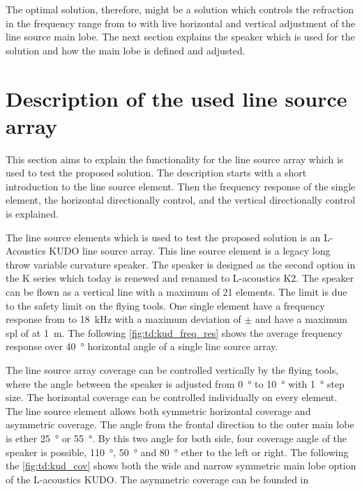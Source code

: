 
The optimal solution, therefore, might be a solution which controls the refraction in the frequency range from  to  with live horizontal and vertical adjustment of the line source main lobe. The next section explains the speaker which is used for the solution and how the main lobe is defined and adjusted.


\section{Description of the used line source array}\label{sec:prop:des_of_lin}

This section aims to explain the functionality for the line source array which is used to test the proposed solution. The description starts with a short introduction to the line source element. Then the frequency response of the single element, the horizontal directionally control, and the vertical directionally control is explained.

The line source elements which is used to test the proposed solution is an L-Acoustics KUDO line source array. This line source element is a legacy long throw variable curvature speaker. The speaker is designed as the second option in the K series which today is renewed and renamed to L-acoustics K2. The speaker can be flown as a vertical line with a maximum of 21 elements. The limit is due to the safety limit on the flying tools. One single element have a frequency response from  to \SI{18}{\kilo\hertz} with a maximum deviation of $\pm$  and have a maximum \gls{spl} of  at \SI{1}{\meter}. The following \autoref{fig:td:kud_freq_res} shows the average frequency response over \SI{40}{\degree} horizontal angle of a single line source array.



The line source array coverage can be controlled vertically by the flying tools, where the angle between the speaker is adjusted from \SI{0}{\degree} to \SI{10}{\degree} with \SI{1}{\degree} step size. The horizontal coverage can be controlled individually on every element. The line source element allows both symmetric horizontal coverage and asymmetric coverage. The angle from the frontal direction to the outer main lobe  is ether \SI{25}{\degree} or \SI{55}{\degree}. By this two angle for both side, four coverage angle of the speaker is possible, \SI{110}{\degree}, \SI{50}{\degree} and \SI{80}{\degree} ether to the left or right. The following the \autoref{fig:td:kud_cov} shows both the wide and narrow symmetric main lobe option of the L-acoustics KUDO. The asymmetric coverage can be founded in \citep{KUDO_data}

